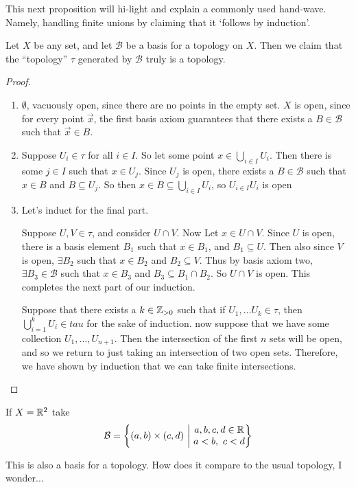 \documentclass[12pt, twosided]{article}
\begin{document}
This next proposition will hi-light and explain a commonly used hand-wave. Namely, handling finite unions by claiming that it `follows by induction'.
\begin{prop}
  Let \(X\) be any set, and let \(\mathcal{B}\) be a basis for a topology on \(X\). Then we claim that the ``topology'' \(\tau\) generated by \(\mathcal{B}\) truly is a topology.
\end{prop}
\begin{proof}
  \begin{enumerate}
  \item \(\emptyset\), vacuously open, since there are no points in the empty set.
    \(X\) is open, since for every point \(\vec{x}\), the first basis axiom guarantees that there exists a \(B \in \mathcal{B}\) such that \(\vec{x} \in B\).
  \item Suppose \(U_i \in \tau\) for all \(i \in I\). So let some point \(x \in \bigcup_{i \in I} U_i\). Then there is some \(j \in I\) such that \(x \in U_j\). Since \(U_j\) is open, there exists a \(B \in \mathcal{B}\) such that \(x \in B\) and \(B \subseteq U_j\). So then \(x \in B \subseteq \bigcup_{i \in I}U_i\), so \(U_{i \in I} U_i\) is open
  \item Let's induct for the final part.

    Suppose \(U, V \in \tau\), and consider \(U \cap V\). Now Let \(x \in U \cap V\). Since \(U\) is open, there is a basis element \(B_1\) such that \(x \in B_1\), and \(B_1 \subseteq U\). Then also since \(V\) is open, \(\exists B_2\) such that \(x \in B_2\) and \(B_2 \subseteq V\). Thus by basis axiom two, \(\exists B_3 \in \mathcal{B}\) such that \(x \in B_3\) and \(B_3 \subseteq B_1 \cap B_2\). So \(U \cap V\) is open. This completes the next part of our induction.

    Suppose that there exists a \(k \in \mathbb{Z}_{>0}\) such that if \(U_1, \ldots U_k \in \tau\), then \(\bigcup_{i = 1}^k U_i \in tau\) for the sake of induction. now suppose that we have some collection \(U_1, \ldots, U_{n+1}\). Then the intersection of the first \(n\) sets will be open, and so we return to just taking an intersection of two open sets. Therefore, we have shown by induction that we can take finite intersections.
  \end{enumerate}
\end{proof}

\begin{exa}
  If \(X = \mathbb{R}^2\) take \[\mathcal{B} = \left\{ (a, b) \times (c, d) \ \middle\vert\  \begin{matrix} a, b, c, d \in \mathbb{R} \\ a < b, \ c < d \end{matrix} \right\}\]

  This is also a basis for a topology. How does it compare to the usual topology, I wonder...
\end{exa}
\end{document}
